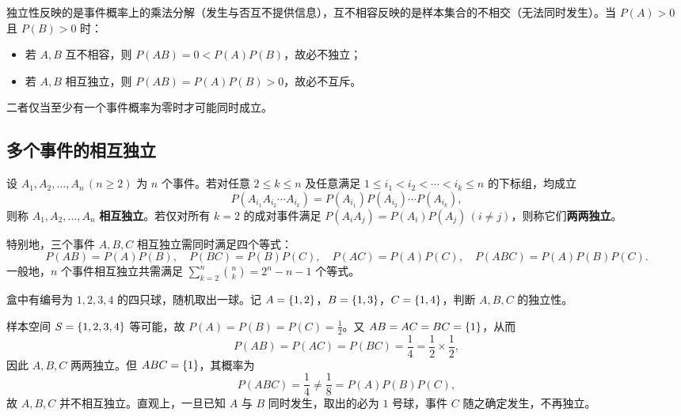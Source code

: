 \begin{pitfall}[独立性与互不相容的关系]
独立性反映的是事件概率上的乘法分解（发生与否互不提供信息），互不相容反映的是样本集合的不相交（无法同时发生）。当 $P(A)>0$ 且 $P(B)>0$ 时：
\begin{itemize}
  \item 若 $A,B$ 互不相容，则 $P(AB)=0<P(A)P(B)$，故必不独立；
  \item 若 $A,B$ 相互独立，则 $P(AB)=P(A)P(B)>0$，故必不互斥。
\end{itemize}
二者仅当至少有一个事件概率为零时才可能同时成立。
\end{pitfall}

\subsection{多个事件的相互独立}

\begin{definition}[多个事件的相互独立]
\label{def:n-independence}
设 $A_1,A_2,\ldots,A_n\,(n\ge 2)$ 为 $n$ 个事件。若对任意 $2\le k\le n$ 及任意满足 $1\le i_1<i_2<\cdots<i_k\le n$ 的下标组，均成立
\begin{equation}
  P(A_{i_1}A_{i_2}\cdots A_{i_k})=P(A_{i_1})P(A_{i_2})\cdots P(A_{i_k}),
  \label{eq:n-independence}
\end{equation}
则称 $A_1,A_2,\ldots,A_n$ \textbf{相互独立}。若仅对所有 $k=2$ 的成对事件满足 $P(A_iA_j)=P(A_i)P(A_j)\,(i\ne j)$，则称它们\textbf{两两独立}。
\end{definition}

特别地，三个事件 $A,B,C$ 相互独立需同时满足四个等式：
\[
  P(AB)=P(A)P(B),\quad P(BC)=P(B)P(C),\quad P(AC)=P(A)P(C),\quad P(ABC)=P(A)P(B)P(C).
\]
一般地，$n$ 个事件相互独立共需满足 $\sum_{k=2}^{n}\binom{n}{k}=2^n-n-1$ 个等式。

\begin{example}[title={两两独立不蕴含相互独立}]
\label{eg:pairwise-not-mutual}
盒中有编号为 $1,2,3,4$ 的四只球，随机取出一球。记 $A=\{1,2\}$，$B=\{1,3\}$，$C=\{1,4\}$，判断 $A,B,C$ 的独立性。
\begin{solution}
样本空间 $S=\{1,2,3,4\}$ 等可能，故 $P(A)=P(B)=P(C)=\frac{1}{2}$。又 $AB=AC=BC=\{1\}$，从而
\[
  P(AB)=P(AC)=P(BC)=\frac{1}{4}=\frac{1}{2}\times\frac{1}{2},
\]
因此 $A,B,C$ 两两独立。但 $ABC=\{1\}$，其概率为
\[
  P(ABC)=\frac{1}{4}\ne\frac{1}{8}=P(A)P(B)P(C),
\]
故 $A,B,C$ 并不相互独立。直观上，一旦已知 $A$ 与 $B$ 同时发生，取出的必为 $1$ 号球，事件 $C$ 随之确定发生，不再独立。
\end{solution}
\end{example}

